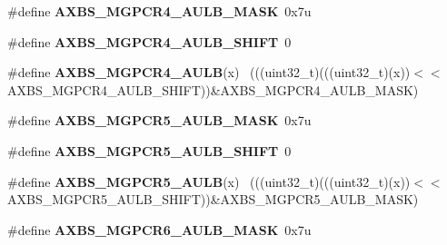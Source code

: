 \begin{DoxyCompactItemize}
\item 
\hypertarget{group___a_x_b_s___register___masks_ga0e8cb920fbcfaaefe210dedc102129d1}{}\#define {\bfseries A\+X\+B\+S\+\_\+\+M\+G\+P\+C\+R4\+\_\+\+A\+U\+L\+B\+\_\+\+M\+A\+S\+K}~0x7u\label{group___a_x_b_s___register___masks_ga0e8cb920fbcfaaefe210dedc102129d1}

\item 
\hypertarget{group___a_x_b_s___register___masks_gaf8f91ac5ba555a8dc2a1733463145139}{}\#define {\bfseries A\+X\+B\+S\+\_\+\+M\+G\+P\+C\+R4\+\_\+\+A\+U\+L\+B\+\_\+\+S\+H\+I\+F\+T}~0\label{group___a_x_b_s___register___masks_gaf8f91ac5ba555a8dc2a1733463145139}

\item 
\hypertarget{group___a_x_b_s___register___masks_gae631564e93f8f913be498e840021e642}{}\#define {\bfseries A\+X\+B\+S\+\_\+\+M\+G\+P\+C\+R4\+\_\+\+A\+U\+L\+B}(x)                                        ~(((uint32\+\_\+t)(((uint32\+\_\+t)(x))$<$$<$A\+X\+B\+S\+\_\+\+M\+G\+P\+C\+R4\+\_\+\+A\+U\+L\+B\+\_\+\+S\+H\+I\+F\+T))\&A\+X\+B\+S\+\_\+\+M\+G\+P\+C\+R4\+\_\+\+A\+U\+L\+B\+\_\+\+M\+A\+S\+K)\label{group___a_x_b_s___register___masks_gae631564e93f8f913be498e840021e642}

\item 
\hypertarget{group___a_x_b_s___register___masks_gaea6c5a570e0ec08d6419d8da4e6d82fd}{}\#define {\bfseries A\+X\+B\+S\+\_\+\+M\+G\+P\+C\+R5\+\_\+\+A\+U\+L\+B\+\_\+\+M\+A\+S\+K}~0x7u\label{group___a_x_b_s___register___masks_gaea6c5a570e0ec08d6419d8da4e6d82fd}

\item 
\hypertarget{group___a_x_b_s___register___masks_gab23b7b12e97e5a14e012697fc5b4ee49}{}\#define {\bfseries A\+X\+B\+S\+\_\+\+M\+G\+P\+C\+R5\+\_\+\+A\+U\+L\+B\+\_\+\+S\+H\+I\+F\+T}~0\label{group___a_x_b_s___register___masks_gab23b7b12e97e5a14e012697fc5b4ee49}

\item 
\hypertarget{group___a_x_b_s___register___masks_gab7a9cbbe6c77b5c5253038b39e592f40}{}\#define {\bfseries A\+X\+B\+S\+\_\+\+M\+G\+P\+C\+R5\+\_\+\+A\+U\+L\+B}(x)                                        ~(((uint32\+\_\+t)(((uint32\+\_\+t)(x))$<$$<$A\+X\+B\+S\+\_\+\+M\+G\+P\+C\+R5\+\_\+\+A\+U\+L\+B\+\_\+\+S\+H\+I\+F\+T))\&A\+X\+B\+S\+\_\+\+M\+G\+P\+C\+R5\+\_\+\+A\+U\+L\+B\+\_\+\+M\+A\+S\+K)\label{group___a_x_b_s___register___masks_gab7a9cbbe6c77b5c5253038b39e592f40}

\item 
\hypertarget{group___a_x_b_s___register___masks_gaed4e41ed477c3cb22bb94ea47a1866f2}{}\#define {\bfseries A\+X\+B\+S\+\_\+\+M\+G\+P\+C\+R6\+\_\+\+A\+U\+L\+B\+\_\+\+M\+A\+S\+K}~0x7u\label{group___a_x_b_s___register___masks_gaed4e41ed477c3cb22bb94ea47a1866f2}


\end{DoxyCompactItemize}
